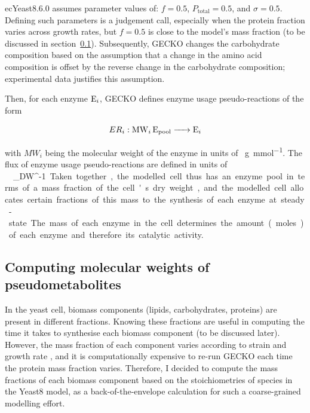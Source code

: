 ecYeast8.6.0 assumes parameter values of: $f = 0.5$, $P_{\mathrm{total}} = 0.5$, and $\sigma = 0.5$.
Defining such parameters is a judgement call, especially when the protein fraction varies across growth rates, but $f = 0.5$ is close to the model's mass fraction (to be discussed in section~\ref{subsec:model-yeast8-molweights}).
Subsequently, GECKO changes the carbohydrate composition based on the assumption that a change in the amino acid composition is offset by the reverse change in the carbohydrate composition;
experimental data justifies this assumption.

Then, for each enzyme $\ce{E_{i}}$, GECKO defines enzyme usage pseudo-reactions of the form

\begin{equation}
  ER_{i}: \ce{ MW_{i} E_{\mathrm{pool}} -> E_{i} }
  \label{eq:model-gecko-enzyme-usage}
\end{equation}

with $MW_{i}$ being the molecular weight of the enzyme in units of \SI{}{\gram~\milli\mole^{-1}}.
The flux of enzyme usage pseudo-reactions are defined in units of \SI{}{\milli\mole~\gram_{DW}^{-1}}.
Taken together, the modelled cell thus has an enzyme pool in terms of a mass fraction of the cell's dry weight, and the modelled cell allocates certain fractions of this mass to the synthesis of each enzyme at steady-state.  The mass of each enzyme in the cell determines the amount (moles) of each enzyme and therefore its catalytic activity.

\subsection{Computing molecular weights of pseudometabolites}
\label{subsec:model-yeast8-molweights}

In the yeast cell, biomass components (lipids, carbohydrates, proteins) are present in different fractions.
Knowing these fractions are useful in computing the time it takes to synthesise each biomass component (to be discussed later).
However, the mass fraction of each component varies according to strain and growth rate \parencite{nilssonMetabolicTradeoffsYeast2016, elsemmanWholecellModelingYeast2022}, and it is computationally expensive to re-run GECKO each time the protein mass fraction varies.
Therefore, I decided to compute the mass fractions of each biomass component based on the stoichiometries of species in the Yeast8 model, as a back-of-the-envelope calculation for such a coarse-grained modelling effort.

